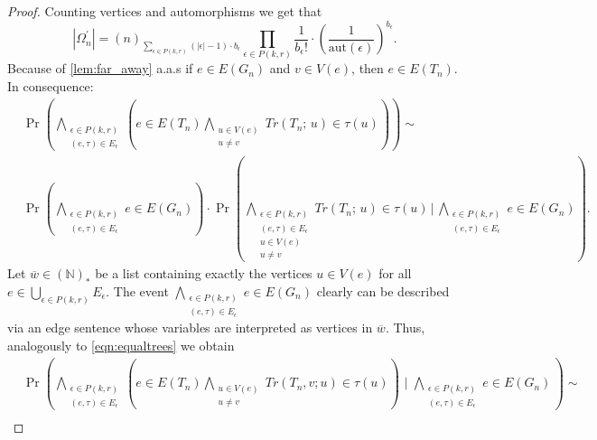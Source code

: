 \documentclass[12pt,notitlepage,a4paper]{article}
\theoremstyle{definition}
\newcommand{\N}{\mathbb{N}}
\newcommand{\aut}{\mathrm{aut}}
\begin{document}
\begin{proof}
		Counting vertices and automorphisms we get that
		\begin{equation} \label{eqn:aux3}
		|\Omega_n^\prime|= (n)_{\sum_{\epsilon\in P(k,r)} 
			(|\epsilon|-1)\cdot b_\epsilon}
		\prod_{\epsilon\in P(k,r)}
		\frac{1}{b_\epsilon!} \cdot
		\left( \frac{1}{\aut(\epsilon)} \right)^
		{b_\epsilon} .
		\end{equation}
		Because of \cref{lem:far_away} a.a.s if $e\in E(G_n)$
		and $v\in V(e)$, then $e\in E(T_n)$. In consequence:
		\begin{align} \label{eqn:aux4}
		&\Pr\left(
		\bigwedge_{\substack{
				\epsilon\in P(k,r)\\
				(e, \tau)\in E_{\epsilon}
		}} \left(
		e\in E(T_n) \bigwedge_{\substack{
				u\in V(e)\\
				u\neq v}} Tr(T_n;\, u)
			\in \tau(u)		
		\right)
		\right)\sim\\ \nonumber
		&\Pr\left(
		\bigwedge_{\substack{
				\epsilon\in P(k,r)\\
				(e, \tau)\in E_{\epsilon}
		}} e\in E(G_n)
		\right)\cdot 		
		\Pr\left(
		\bigwedge_{\substack{
				\epsilon\in P(k,r)\\
				(e, \tau)\in E_{\epsilon}\\
				u\in V(e)\\
				u\neq v
		}}Tr(T_n;\, u)\in \tau(u)	
		\, \Bigg| \, 
		\bigwedge_{\substack{
		\epsilon\in P(k,r)\\
		(e, \tau)\in E_{\epsilon}
		}} e\in E(G_n)
		\right).
		\end{align}
	Let $\overline{w}\in (\N)_*$ be a list containing exactly
	the vertices $u\in V(e)$ for all $e\in 
	\bigcup_{\epsilon\in P(k,r)} E_\epsilon$. 
	The event 
	$ \bigwedge_{\substack{
			\epsilon\in P(k,r)\\
			(e, \tau)\in E_{\epsilon}
	}} e\in E(G_n)$ clearly can be described via an edge sentence
	whose variables are interpreted as vertices in $\overline{w}$.
	Thus, analogously to \cref{eqn:equaltrees}
	we obtain 
	\begin{align} \label{eqn:aux5}
	&	\Pr\left(
	\bigwedge_{\substack{
			\epsilon\in P(k,r)\\
			(e, \tau)\in E_{\epsilon}
	}} \left(
	e\in E(T_n) \bigwedge_{\substack{
			u\in V(e)\\
			u\neq v}} Tr(T_n,v;u)\in \tau(u)		
	\right) \, \, \Big| \, \,
	\bigwedge_{\substack{
			\epsilon\in P(k,r)\\
			(e, \tau)\in E_{\epsilon}
	}} e\in E(G_n)\,	
	\right)\sim \\ \nonumber

\end{align}
\end{proof}
\end{document}
